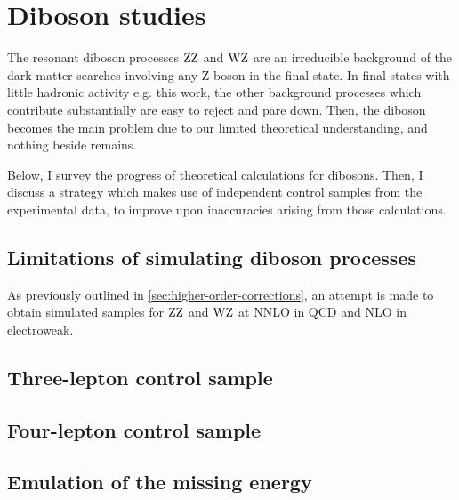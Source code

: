 \chapter{Diboson studies}
\label{chap:dibosons}

The resonant diboson processes $\mbox{Z}\mbox{Z}$ and $\mbox{W}\mbox{Z}$ are an irreducible background of the
dark matter searches involving any Z boson in the final state.
In final states with little hadronic activity e.g. this work, 
the other background processes which contribute substantially are easy to reject and pare down.
Then, the diboson becomes the main problem due to our limited theoretical understanding, and nothing beside remains.

Below, I survey the progress of theoretical calculations for dibosons. 
Then, I discuss a strategy which makes use of independent control samples from the experimental data,
to improve upon inaccuracies arising from those calculations.

%
\section{Limitations of simulating diboson processes}
As previously outlined in \ref{sec:higher-order-corrections}, an attempt is made to obtain simulated samples for $\mbox{Z}\mbox{Z}$ and $\mbox{W}\mbox{Z}$ at NNLO in QCD and NLO in electroweak. 
\section{Three-lepton control sample}
\section{Four-lepton control sample}
\section{Emulation of the missing energy}

